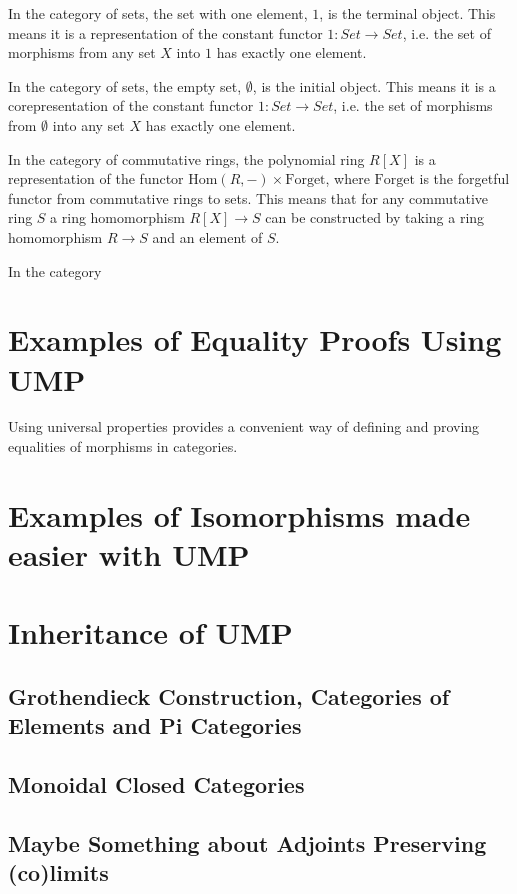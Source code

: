 \documentclass[12pt]{article} %
\theoremstyle{definition}
\theoremstyle{definition}
\theoremstyle{definition}
\theoremstyle{definition}
\begin{document}
In the category of sets, the set with one element, $1$, is the terminal object. This means it is a representation
of the constant functor $1 : Set \to Set$, i.e. the set of morphisms from any set $X$ into $1$ has exactly
one element.

In the category of sets, the empty set, $\emptyset$, is the initial object. This means it is a corepresentation
of the constant functor $1 : Set \to Set$, i.e. the set of morphisms from $\emptyset$ into any set $X$ has
exactly one element.

In the category of commutative rings, the polynomial ring $R[X]$ is a representation of the functor
$\text{Hom}(R, -) \times \text{Forget}$, where $\text{Forget}$ is the forgetful
functor from commutative rings to sets. This means that for any commutative ring $S$ a ring homomorphism
$R[X] \to S$ can be constructed by taking a ring homomorphism $R \to S$ and an element of $S$.

In the category


\section{Examples of Equality Proofs Using UMP}

Using universal properties provides a convenient way of defining and proving equalities of morphisms in
categories.

\section{Examples of Isomorphisms made easier with UMP}


\section{Inheritance of UMP}

\subsection{Grothendieck Construction, Categories of Elements and Pi Categories}

\subsection{Monoidal Closed Categories}

\subsection{Maybe Something about Adjoints Preserving (co)limits}
\end{document}
